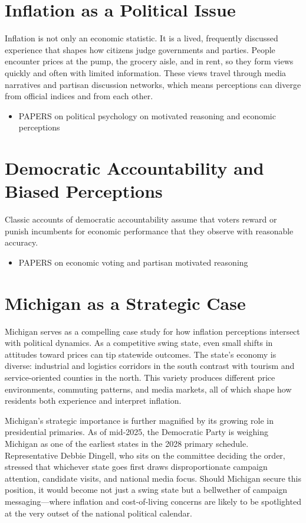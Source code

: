 \documentclass[preprint,12pt,authoryear]{elsarticle}
\begin{document}
\section{Inflation as a Political Issue}
Inflation is not only an economic statistic. It is a lived, frequently discussed experience that shapes how citizens judge governments and parties. People encounter prices at the pump, the grocery aisle, and in rent, so they form views quickly and often with limited information. These views travel through media narratives and partisan discussion networks, which means perceptions can diverge from official indices and from each other.

\begin{itemize}
    \item PAPERS on political psychology on motivated reasoning and economic perceptions
\end{itemize}


\section{Democratic Accountability and Biased Perceptions }

Classic accounts of democratic accountability assume that voters reward or punish incumbents for economic performance that they observe with reasonable accuracy.

\begin{itemize}
    \item PAPERS on economic voting and partisan motivated reasoning
\end{itemize}




\section{Michigan as a Strategic Case}
Michigan serves as a compelling case study for how inflation perceptions intersect with political dynamics. As a competitive swing state, even small shifts in attitudes toward prices can tip statewide outcomes. The state’s economy is diverse: industrial and logistics corridors in the south contrast with tourism and service-oriented counties in the north. This variety produces different price environments, commuting patterns, and media markets, all of which shape how residents both experience and interpret inflation.

Michigan’s strategic importance is further magnified by its growing role in presidential primaries. As of mid-2025, the Democratic Party is weighing Michigan as one of the earliest states in the 2028 primary schedule. Representative Debbie Dingell, who sits on the committee deciding the order, stressed that whichever state goes first draws disproportionate campaign attention, candidate visits, and national media focus. Should Michigan secure this position, it would become not just a swing state but a bellwether of campaign messaging—where inflation and cost-of-living concerns are likely to be spotlighted at the very outset of the national political calendar.
\end{document}
